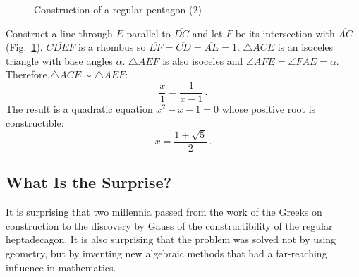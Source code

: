 \begin{figure}[t]
\begin{center}
\end{center}
\caption{Construction of a regular pentagon (2)}\label{f.hept-pentagon3}
\end{figure}

Construct a line through $E$ parallel to $\overline{DC}$ and let $F$ be its intersection with $\overline{AC}$ (Fig.~\ref{f.hept-pentagon3}). $\overline{CDEF}$ is a rhombus so $\overline{EF}=\overline{CD}=\overline{AE}=1$. $\triangle ACE$ is an isoceles triangle with base angles $\alpha$. $\triangle AEF$ is also isoceles and $\angle AFE=\angle FAE=\alpha$. Therefore,$\triangle ACE\sim\triangle AEF$:
\[
\frac{x}{1}=\frac{1}{x-1}\,.
\]
The result is a quadratic equation $x^2-x-1=0$
whose positive root is constructible:
\[
x=\frac{1+\sqrt{5}}{2}\,.
\]

\subsection*{What Is the Surprise?}

It is surprising that two millennia passed from the work of the Greeks on construction to the discovery by Gauss of the constructibility of the regular heptadecagon. It is also surprising that the problem was solved not by using geometry, but by inventing new algebraic methods that had a far-reaching influence in mathematics.


